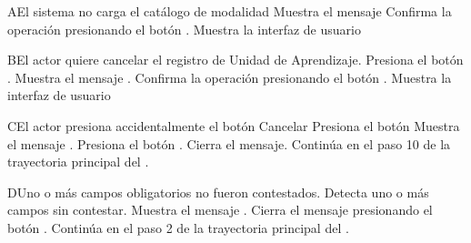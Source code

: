
\begin{UCtrayectoriaA}{A}{El sistema no carga el catálogo de modalidad}
	\UCpaso Muestra el mensaje 
	\UCpaso[\UCactor] Confirma la operación presionando el botón .
	 \UCpaso Muestra la interfaz de usuario 

\end{UCtrayectoriaA}



\begin{UCtrayectoriaA}{B}{El actor quiere cancelar el registro de Unidad de Aprendizaje.}
	\UCpaso[\UCactor] Presiona el botón .
	\UCpaso Muestra el mensaje .
	\UCpaso[\UCactor] Confirma la operación presionando el botón .
	\UCpaso Muestra la interfaz de usuario 
\end{UCtrayectoriaA}




\begin{UCtrayectoriaA}{C}{El actor presiona accidentalmente el botón Cancelar}
	\UCpaso[\UCactor] Presiona el botón 
	\UCpaso Muestra el mensaje .
	\UCpaso[\UCactor] Presiona el botón .
	\UCpaso Cierra el mensaje.
	\UCpaso Continúa en el paso 10 de la trayectoria principal del .
\end{UCtrayectoriaA}




\begin{UCtrayectoriaA}{D}{Uno o más campos obligatorios no fueron contestados.}
	\UCpaso Detecta uno o más campos sin contestar.
	\UCpaso Muestra el mensaje .
	\UCpaso[\UCactor] Cierra el mensaje presionando el botón .
	\UCpaso Continúa en el paso 2 de la trayectoria principal del .
\end{UCtrayectoriaA}